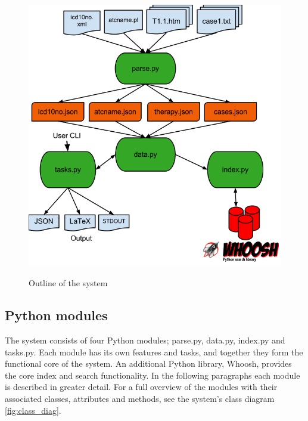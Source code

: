 \begin{figure}
	\centering
	\includegraphics[width=1.1\textwidth]{./img/system_architecture2.png}\\
	\caption{Outline of the system}
	\label{fig:system_arch}
\end{figure}

\subsection{Python modules}
The system consists of four Python modules; parse.py, data.py, index.py and tasks.py. Each module has its own features and tasks, and together they form the functional core of the system. An additional Python library, Whoosh, provides the core index and search functionality. In the following paragraphs each module is described in greater detail. For a full overview of the modules with their associated classes, attributes and methods, see the system's class diagram \ref{fig:class_diag}.

